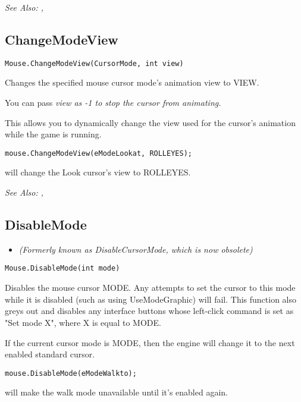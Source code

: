 \it{See Also:} ,


\subsection{ChangeModeView}\label{Mouse.ChangeModeView}%

\begin{verbatim}
Mouse.ChangeModeView(CursorMode, int view)
\end{verbatim}
Changes the specified mouse cursor mode's animation view to VIEW.

You can pass \it{view} as -1 to stop the cursor from animating.

This allows you to dynamically change the view used for the cursor's animation
while the game is running.

\begin{verbatim}
mouse.ChangeModeView(eModeLookat, ROLLEYES);
\end{verbatim}
will change the Look cursor's view to ROLLEYES.

\it{See Also:} ,


\subsection{DisableMode}\label{Mouse.DisableMode}%

\begin{itemize}
\item \it{(Formerly known as DisableCursorMode, which is now obsolete)}
\end{itemize}

\begin{verbatim}
Mouse.DisableMode(int mode)
\end{verbatim}
Disables the mouse cursor MODE. Any attempts to set the cursor to this mode
while it is disabled (such as using UseModeGraphic) will fail. This function
also greys out and disables any interface buttons whose left-click command
is set as "Set mode X", where X is equal to MODE.

If the current cursor mode is MODE, then the engine will change it to the
next enabled standard cursor.

\begin{verbatim}
mouse.DisableMode(eModeWalkto);
\end{verbatim}
will make the walk mode unavailable until it's enabled again.

